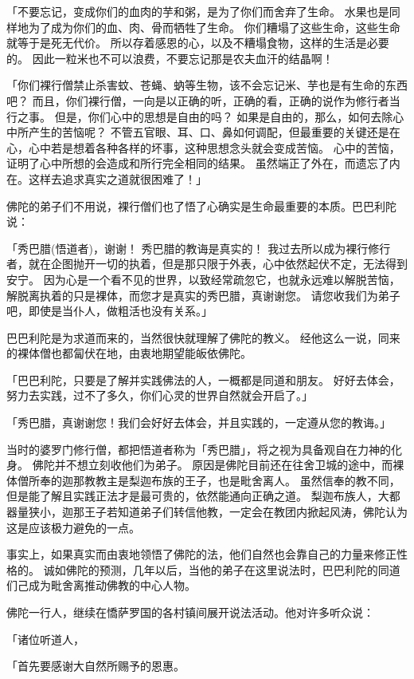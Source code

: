 \documentclass[twoside,openany]{book}
\begin{document}
「不要忘记，变成你们的血肉的芋和粥，是为了你们而舍弃了生命。
水果也是同样地为了成为你们的血、肉、骨而牺牲了生命。
你们糟塌了这些生命，这些生命就等于是死无代价。
所以存着感恩的心，以及不糟塌食物，这样的生活是必要的。
因此一粒米也不可以浪费，不要忘记那是农夫血汗的结晶啊！

「你们裸行僧禁止杀害蚊、苍蝇、蚋等生物，该不会忘记米、芋也是有生命的东西吧？
而且，你们裸行僧，一向是以正确的听，正确的看，正确的说作为修行者当行之事。
但是，你们心中的思想是自由的吗？
如果是自由的，那么，如何去除心中所产生的苦恼呢？
不管五官眼、耳、口、鼻如何调配，但最重要的关键还是在心，心中若是想着各种各样的坏事，这种思想念头就会变成苦恼。
心中的苦恼，证明了心中所想的会造成和所行完全相同的结果。
虽然端正了外在，而遗忘了内在。这样去追求真实之道就很困难了！」

佛陀的弟子们不用说，裸行僧们也了悟了心确实是生命最重要的本质。巴巴利陀说：

「秀巴腊(悟道者)，谢谢！
秀巴腊的教诲是真实的！
我过去所以成为裸行修行者，就在企图抛开一切的执着，但是那只限于外表，心中依然起伏不定，无法得到安宁。
因为心是一个看不见的世界，以致经常疏忽它，也就永远难以解脱苦恼，解脱离执着的只是裸体，而您才是真实的秀巴腊，真谢谢您。
请您收我们为弟子吧，即使是当仆人，做粗活也没有关系。」

巴巴利陀是为求道而来的，当然很快就理解了佛陀的教义。
经他这么一说，同来的裸体僧也都匐伏在地，由衷地期望能皈依佛陀。

「巴巴利陀，只要是了解并实践佛法的人，一概都是同道和朋友。
好好去体会，努力去实践，过不了多久，你们心灵的世界自然就会开启了。」

「秀巴腊，真谢谢您！我们会好好去体会，并且实践的，一定遵从您的教诲。」

当时的婆罗门修行僧，都把悟道者称为「秀巴腊」，将之视为具备观自在力神的化身。
佛陀并不想立刻收他们为弟子。
原因是佛陀目前还在往舍卫城的途中，而裸体僧所奉的迦那教教主是梨迦布族的王子，也是毗舍离人。
虽然信奉的教不同，但是能了解且实践正法才是最可贵的，依然能通向正确之道。
梨迦布族人，大都器量狭小，迦那王子若知道弟子们转信他教，一定会在教团内掀起风涛，佛陀认为这是应该极力避免的一点。

事实上，如果真实而由衷地领悟了佛陀的法，他们自然也会靠自己的力量来修正性格的。
诚如佛陀的预测，几年以后，当他的弟子在这里说法时，巴巴利陀的同道们己成为毗舍离推动佛教的中心人物。

佛陀一行人，继续在憍萨罗国的各村镇间展开说法活动。他对许多听众说：

「诸位听道人，

「首先要感谢大自然所赐予的恩惠。
\end{document}
